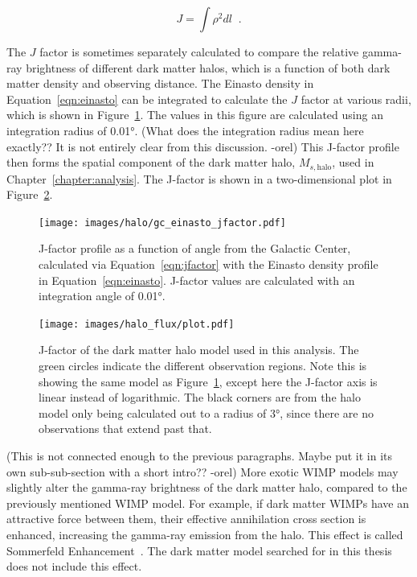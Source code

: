     \begin{equation}\label{eqn:jfactor}
      J = \int \rho^2 dl \;\; .
    \end{equation}

    The $J$ factor is sometimes separately calculated to compare the relative gamma-ray brightness of different dark matter halos, which is a function of both dark matter density and observing distance.
    The Einasto density in Equation~\ref{eqn:einasto} can be integrated to calculate the $J$ factor at various radii, which is shown in Figure~\ref{fig:gchalo_jfactor}.
    The values in this figure are calculated using an integration radius of \ang{0.01}.
    {\color{red}(What does the integration radius mean here exactly?? It is not entirely clear from this discussion. -orel)}
    This J-factor profile then forms the spatial component of the dark matter halo, $M_{s,\textrm{halo}}$, used in Chapter~\ref{chapter:analysis}.
    The J-factor is shown in a two-dimensional plot in Figure~\ref{fig:halojfactor}.
    
    \begin{figure}[ht]
    \centering
      \texttt{[image: images/halo/gc\_einasto\_jfactor.pdf]}
      \caption[Galactic Center Einasto Halo Jfactor]{
        J-factor profile as a function of angle from the Galactic Center, calculated via Equation~\ref{eqn:jfactor} with the Einasto density profile in Equation~\ref{eqn:einasto}.
        J-factor values are calculated with an integration angle of \ang{0.01}.
      }
      \label{fig:gchalo_jfactor}
    \end{figure}
    
  
  \begin{figure}[ht]
    \centering
    \texttt{[image: images/halo\_flux/plot.pdf]}
    \caption[Galactic Center Halo J-factor Skymap]{
      J-factor of the dark matter halo model used in this analysis.
      The green circles indicate the different observation regions.
      Note this is showing the same model as Figure~\ref{fig:gchalo_jfactor}, except here the J-factor axis is linear instead of logarithmic.
      The black corners are from the halo model only being calculated out to a radius of \ang{3}, since there are no observations that extend past that.
    }
    \label{fig:halojfactor}
  \end{figure}

  {\color{red}(This is not connected enough to the previous paragraphs. Maybe put it in its own sub-sub-section with a short intro?? -orel)}
  More exotic WIMP models may slightly alter the gamma-ray brightness of the dark matter halo, compared to the previously mentioned WIMP model.
  For example, if dark matter WIMPs have an attractive force between them, their effective annihilation cross section is enhanced, increasing the gamma-ray emission from the halo.
  This effect is called Sommerfeld Enhancement~\cite{sommerfeld}.
  The dark matter model searched for in this thesis does not include this effect.
    
